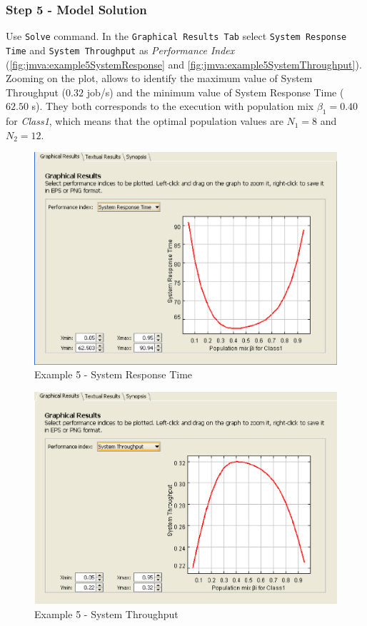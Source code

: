 \subsubsection{Step 5 - Model Solution}
Use \texttt{Solve} command. In the \texttt{Graphical Results Tab}
select \texttt{System Response Time} and \texttt{System Throughput}
as \emph{Performance Index}
(\autoref{fig:jmva:example5SystemResponse} and
\autoref{fig:jmva:example5SystemThroughput}). Zooming on the plot,
allows to identify the maximum value of System Throughput ($0.32$
job/s) and the minimum value of System Response Time ($62.50$ s).
They both corresponds to the execution with population mix $\beta_1
= 0.40$ for \emph{Class1}, which means that the optimal population
values are $N_1 = 8$ and $N_2 = 12$.

\begin{figure}[htbp]
    \begin{center}
        \includegraphics[scale=.5]{img/jmva/example5SystemResponse}
    \end{center}
    \caption{Example 5 - System Response Time}
    \label{fig:jmva:example5SystemResponse}
\end{figure}

\begin{figure}[htbp]
    \begin{center}
        \includegraphics[scale=.5]{img/jmva/example5SystemThroughput}
    \end{center}
    \caption{Example 5 - System Throughput}
    \label{fig:jmva:example5SystemThroughput}
\end{figure}
